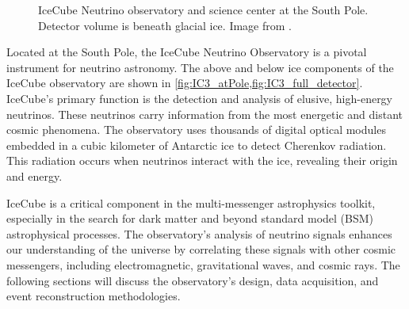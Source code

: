 \begin{figure}[h!]
    \caption{IceCube Neutrino observatory and science center at the South Pole. Detector volume is beneath glacial ice. Image from \cite{IceCube_SPGallery}.}
    \label{fig:IC3_atPole}
\end{figure}

Located at the South Pole, the IceCube Neutrino Observatory is a pivotal instrument for neutrino astronomy.
The above and below ice components of the IceCube observatory are shown in \cref{fig:IC3_atPole,fig:IC3_full_detector}.
IceCube's primary function is the detection and analysis of elusive, high-energy neutrinos.
These neutrinos carry information from the most energetic and distant cosmic phenomena.
The observatory uses thousands of digital optical modules embedded in a cubic kilometer of Antarctic ice to detect Cherenkov radiation.
This radiation occurs when neutrinos interact with the ice, revealing their origin and energy.

IceCube is a critical component in the multi-messenger astrophysics toolkit, especially in the search for dark matter and beyond standard model (BSM) astrophysical processes.
The observatory's analysis of neutrino signals enhances our understanding of the universe by correlating these signals with other cosmic messengers, including electromagnetic, gravitational waves, and cosmic rays.
The following sections will discuss the observatory's design, data acquisition, and event reconstruction methodologies.


